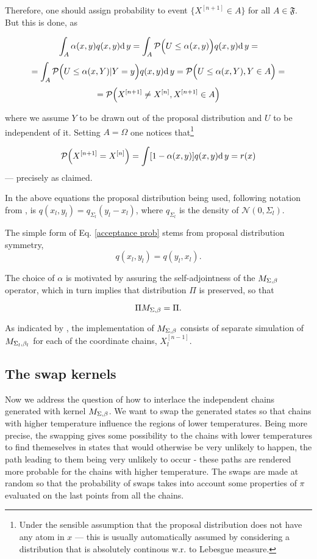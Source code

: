 Therefore, one should assign probability to event $\{ X^{[n+1]} \in A\}$ for all $A \in \mathfrak{F}$. But this is done, as

$$\int_A  \alpha(x,y) q(x,y) \mathrm{d}\,y = \int_A \mathcal{P} \Big( U \leq \alpha(x,y) \Big)q(x,y) \mathrm{d}\,y =$$
$$
	=\int_A \mathcal{P}\Big( U \leq \alpha(x,Y) | Y=y \Big)q(x,y) \mathrm{d}\,y = \mathcal{P}\Big( U \leq \alpha(x,Y), Y \in A \Big)=
$$
$$
	= \mathcal{P}\Big(X^{[n+1]} \not= X^{[n]} , X^{[n+1]} \in A \Big)
$$

where we assume $Y$ to be drawn out of the proposal distribution and $U$ to be independent of it. Setting $A = \Omega$ one notices that\footnote{Under the sensible assumption that the proposal distribution does not have any atom in $x$ --- this is usually automatically assumed by considering a distribution that is absolutely continous w.r. to Lebesgue measure.} 

$$ \mathcal{P}\Big(X^{[n+1]} = X^{[n]}\Big) = \int  [ 1 - \alpha(x,y)] q(x,y) \mathrm{d}\,y = r(x)$$
--- precisely as claimed. 

In the above equations the proposal distribution being used, following notation from \cite{CharlesJ.Geyer}, is $q(x_l,y_l) = q_{\Sigma_l} (y_l - x_l)$, where $q_{\Sigma_l}$ is the density of $\mathcal{N}(0, \Sigma_l)$. 

The simple form of Eq. \ref{acceptance prob} stems from proposal distribution symmetry, $$q(x_l,y_l) = q(y_l,x_l).$$

The choice of $\alpha$ is motivated by assuring the self-adjointness of the $M_{\Sigma,\beta}$ operator, which in turn implies that distribution $\Pi$ is preserved, so that
	
\begin{equation}
	\Pi M_{\Sigma,\beta} = \Pi.		
\end{equation}	

As indicated by \cite{BM2}, the implementation of $M_{\Sigma,\beta}$ consists of separate simulation of $M_{\Sigma_{l},\beta_{l}}$ for each of the coordinate chains,  $X^{[n-1]}_l$.

	\subsection*{The swap kernels}

Now we address the question of how to interlace the independent chains generated with kernel $M_{\Sigma,\beta}$. We want to swap the generated states so that chains with higher temperature influence the regions of lower temperatures. Being more precise, the swapping gives some possibility to the chains with lower temperatures to find themeselves in states that would otherwise be very unlikely to happen, the path leading to them being very unlikely to occur - these paths are rendered more probable for the chains with higher temperature. The swaps are made at random so that the probability of swaps takes into account some properties of $\pi$ evaluated on the last points from all the chains. 

